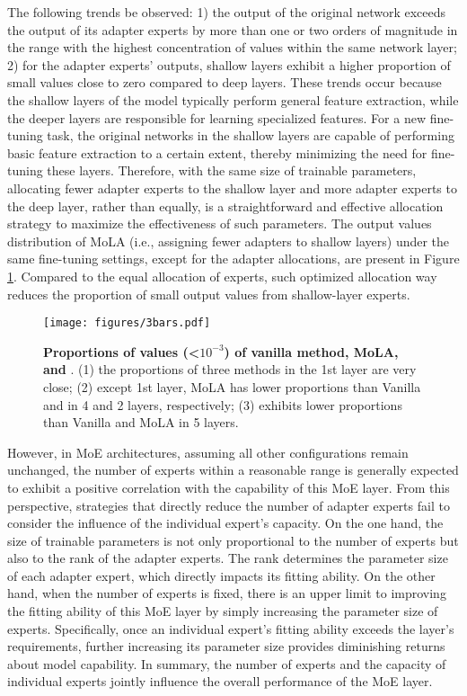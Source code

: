The following trends be observed: 1) the output of the original network exceeds the output of its adapter experts by more than one or two orders of magnitude in the range with the highest concentration of values within the same network layer; 2) for the adapter experts’ outputs, shallow layers exhibit a higher proportion of small values close to zero compared to deep layers. These trends occur because the shallow layers of the model typically perform general feature extraction, while the deeper layers are responsible for learning specialized features. For a new fine-tuning task, the original networks in the shallow layers are capable of performing basic feature extraction to a certain extent, thereby minimizing the need for fine-tuning these layers. Therefore, with the same size of trainable parameters, allocating fewer adapter experts to the shallow layer and more adapter experts to the deep layer, rather than equally, is a straightforward and effective allocation strategy to maximize the effectiveness of such parameters. The output values distribution of MoLA (i.e., assigning fewer adapters to shallow layers) under the same fine-tuning settings, except for the adapter allocations, are present in Figure \ref{fig:3bar}. Compared to the equal allocation of experts, such optimized allocation way reduces the proportion of small output values from shallow-layer experts. 

\begin{figure}[t]
    \centering
    \texttt{[image: figures/3bars.pdf]}
    \caption{\textbf{Proportions of values (\textless$10^{-3}$) of vanilla method, MoLA, and \name}. (1) the proportions of three methods in the 1st layer are very close; (2) except 1st layer, MoLA has lower proportions than Vanilla and \name in 4 and 2 layers, respectively; (3) \name exhibits lower proportions than Vanilla and MoLA in 5 layers.}
    \label{fig:3bar}
\end{figure}

However, in MoE architectures, assuming all other configurations remain unchanged, the number of experts within a reasonable range is generally expected to exhibit a positive correlation with the capability of this MoE layer. From this perspective, strategies that directly reduce the number of adapter experts fail to consider the influence of the individual expert’s capacity. On the one hand, the size of trainable parameters is not only proportional to the number of experts but also to the rank of the adapter experts. The rank determines the parameter size of each adapter expert, which directly impacts its fitting ability. On the other hand, when the number of experts is fixed, there is an upper limit to improving the fitting ability of this MoE layer by simply increasing the parameter size of experts. Specifically, once an individual expert’s fitting ability exceeds the layer’s requirements, further increasing its parameter size provides diminishing returns about model capability. In summary, the number of experts and the capacity of individual experts jointly influence the overall performance of the MoE layer.

